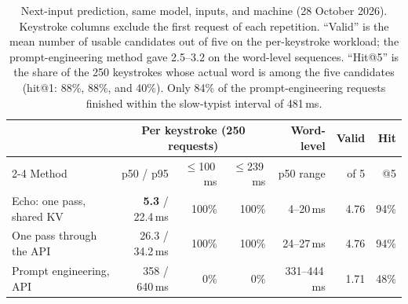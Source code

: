 \documentclass[11pt,a4paper]{article}
\begin{document}
\begin{table}[ht]
\centering\footnotesize\setlength{\tabcolsep}{4pt}
\begin{tabular}{@{}lrrrrrr@{}}
\toprule
 & \multicolumn{3}{c}{Per keystroke (250 requests)} & Word-level & Valid & Hit\\
\cmidrule(lr){2-4}
Method & p50 / p95 & $\le$100\,ms & $\le$239\,ms & p50 range & of 5 & @5\\
\midrule
Echo: one pass, shared KV & \textbf{5.3} / 22.4\,ms & 100\% & 100\% & 4--20\,ms & 4.76 & 94\%\\
One pass through the API & 26.3 / 34.2\,ms & 100\% & 100\% & 24--27\,ms & 4.76 & 94\%\\
Prompt engineering, API & 358 / 640\,ms & 0\% & 0\% & 331--444\,ms & 1.71 & 48\%\\
\bottomrule
\end{tabular}
\caption{Next-input prediction, same model, inputs, and machine (28 October 2026). Keystroke columns exclude the first request of each repetition. ``Valid'' is the mean number of usable candidates out of five on the per-keystroke workload; the prompt-engineering method gave 2.5--3.2 on the word-level sequences. ``Hit@5'' is the share of the 250 keystrokes whose actual word is among the five candidates (hit@1: 88\%, 88\%, and 40\%). Only 84\% of the prompt-engineering requests finished within the slow-typist interval of 481\,ms.}
\label{tab:prediction}
\end{table}
\end{document}
